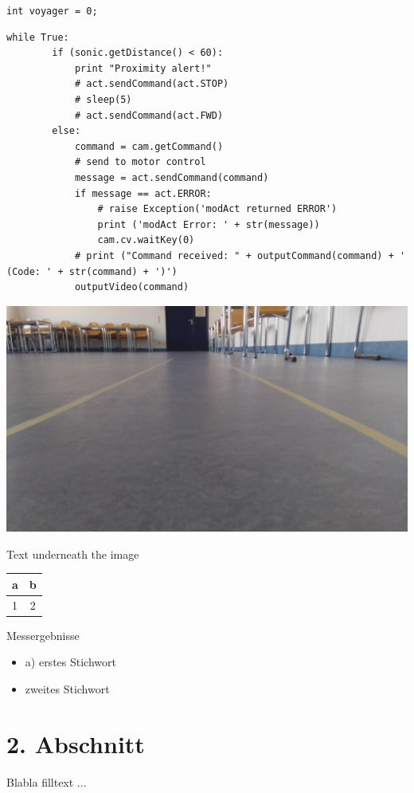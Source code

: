 \documentclass[a4paper,10pt]{article}
\begin{document}

    \lstinline{int voyager = 0;}

    \begin{lstlisting}[style=pythonStyle,label=python-02,caption=Python-Code]
    while True:
        if (sonic.getDistance() < 60):
            print "Proximity alert!"
            # act.sendCommand(act.STOP)
            # sleep(5)
            # act.sendCommand(act.FWD)
        else:
            command = cam.getCommand()
            # send to motor control
            message = act.sendCommand(command)
            if message == act.ERROR:
                # raise Exception('modAct returned ERROR')
                print ('modAct Error: ' + str(message))
                cam.cv.waitKey(0)
            # print ("Command received: " + outputCommand(command) + ' (Code: ' + str(command) + ')')
            outputVideo(command)
    \end{lstlisting}
 
    \begin{minipage}{\columnwidth}
      \makeatletter
      \def\@captype{figure}
      \makeatother
      \centering
      \includegraphics[width=0.8\linewidth]{images/image.png}
      \caption{Text underneath the image}
      \label{fig:image-01}
    \end{minipage}

    \begin{minipage}{\columnwidth}
      \makeatletter
      \def\@captype{table}
      \makeatother
      \centering
      \begin{tabular}{ l | c }
      a & b \\ \hline \hline
      1 & 2 \\
      \end{tabular}
      \caption{Messergebnisse}
      \label{tab:122}
    \end{minipage}

  \begin{itemize}
  \item{a)} erstes Stichwort
  \item zweites Stichwort
  \end{itemize}

  \section{2. Abschnitt}
    Blabla filltext ... \\

	
  
\end{document}
